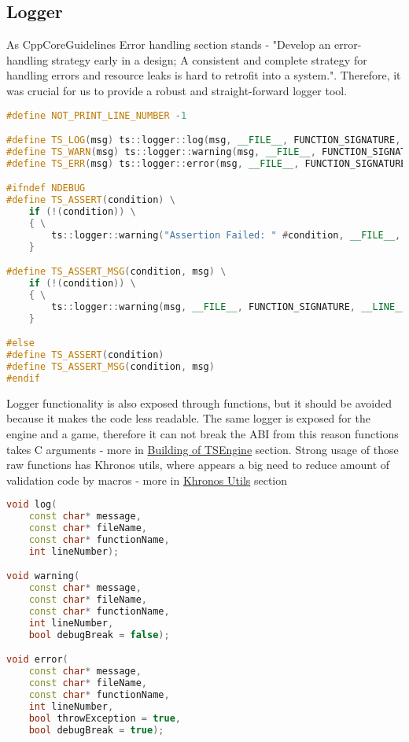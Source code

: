 \newpage

\subsection{Logger}
\label{sec:logger}

\hspace{\parindent} As CppCoreGuidelines \cite{CppCoreGuidelines} Error handling section stands - "Develop an error-handling strategy early in a design; A consistent and complete strategy for handling errors and resource leaks is hard to retrofit into a system.". Therefore, it was crucial for us to provide a robust and straight-forward logger tool.
\begin{lstlisting}[language=c++, caption=Logger macros (./engine/include/tsengine/logger.h)]
#define NOT_PRINT_LINE_NUMBER -1

#define TS_LOG(msg) ts::logger::log(msg, __FILE__, FUNCTION_SIGNATURE, __LINE__)
#define TS_WARN(msg) ts::logger::warning(msg, __FILE__, FUNCTION_SIGNATURE, __LINE__)
#define TS_ERR(msg) ts::logger::error(msg, __FILE__, FUNCTION_SIGNATURE, __LINE__)

#ifndef NDEBUG
#define TS_ASSERT(condition) \
    if (!(condition)) \
    { \
        ts::logger::warning("Assertion Failed: " #condition, __FILE__, FUNCTION_SIGNATURE, __LINE__, true); \
    }

#define TS_ASSERT_MSG(condition, msg) \
    if (!(condition)) \
    { \
        ts::logger::warning(msg, __FILE__, FUNCTION_SIGNATURE, __LINE__, true); \
    }

#else
#define TS_ASSERT(condition)
#define TS_ASSERT_MSG(condition, msg)
#endif
\end{lstlisting}

\newpage

Logger functionality is also exposed through functions, but it should be avoided because it makes the code less readable. The same logger is exposed for the engine and a game, therefore it can not break the ABI from this reason functions takes C arguments - more in \hyperref[sec:build]{Building of TSEngine} section.
Strong usage of those raw functions has Khronos utils, where appears a big need to reduce amount of validation code by macros - more in \hyperref[sec:khronos_utils]{Khronos Utils} section
\begin{lstlisting}[language=c++, caption=Logger's functions (./engine/include/tsengine/logger.h)]
void log(
    const char* message,
    const char* fileName,
    const char* functionName,
    int lineNumber);

void warning(
    const char* message,
    const char* fileName,
    const char* functionName,
    int lineNumber,
    bool debugBreak = false);

void error(
    const char* message,
    const char* fileName,
    const char* functionName,
    int lineNumber,
    bool throwException = true,
    bool debugBreak = true);
\end{lstlisting}

